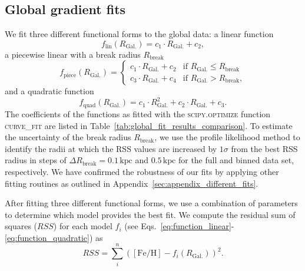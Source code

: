 \documentclass[fleqn,usenatbib]{mnras}
\begin{document}
\subsection{Global gradient fits}
\label{sec:global_fits}

We fit three different functional forms to the global data: a linear function
\begin{equation}
f_{\text{lin}}(R_\mathrm{Gal.}) = c_1 \cdot R_\mathrm{Gal.} + c_2, \label{eq:function_linear}
\end{equation}
a piecewise linear with a break radius $R_\mathrm{break}$
\begin{equation}
f_{\text{piece}}(R_\mathrm{Gal.}) = 
\begin{cases} 
c_1 \cdot R_\mathrm{Gal.} + c_2 & \text{if } R_\mathrm{Gal.} \leq R_\mathrm{break} \\
c_3 \cdot R_\mathrm{Gal.} + c_4 & \text{if } R_\mathrm{Gal.} > R_\mathrm{break},  \label{eq:function_piecewise}
\end{cases}
\end{equation}
and a quadratic function
\begin{equation}
f_{\text{quad}}(R_\mathrm{Gal.}) = c_1 \cdot R_\mathrm{Gal.}^2 + c_2 \cdot R_\mathrm{Gal.} + c_3.  \label{eq:function_quadratic}
\end{equation}
The coefficients of the functions as fitted with the \textsc{scipy.optimize} function \textsc{curve\_fit} \citep{Scipy} are listed in Table~\ref{tab:global_fit_results_comparison}. To estimate the uncertainty of the break radius $R_\mathrm{break}$, we use the profile likelihood method to identify the radii at which the RSS values are increased by $1\sigma$ from the best RSS radius in steps of $\Delta R_\mathrm{break} = 0.1\,\mathrm{kpc}$ and $0.5\,\mathrm{kpc}$ for the full and binned data set, respectively. We have confirmed the robustness of our fits by applying other fitting routines as outlined in Appendix~\ref{sec:appendix_different_fits}.

After fitting three different functional forms, we use a combination of parameters to determine which model provides the best fit. We compute the residual sum of squares ($RSS$) for each model $f_i$ (see Eqs.~\ref{eq:function_linear}-\ref{eq:function_quadratic}) as 
\begin{equation} \label{eq:rss}
    RSS = \sum_i^n \left( \mathrm{[Fe/H]} - f_i(R_\mathrm{Gal.}) \right)^2.
\end{equation}
\end{document}
